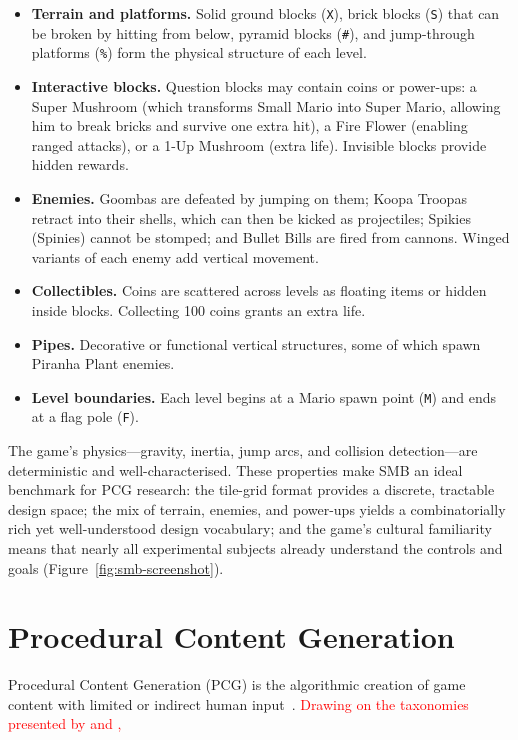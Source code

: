 \documentclass[shortabstract, mgr, english]{iithesis}
\newcommand{\changed}[1]{\textcolor{red}{#1}}
\begin{document}
\begin{itemize}[nosep]
  \item \textbf{Terrain and platforms.} Solid ground blocks (\texttt{X}), brick blocks
        (\texttt{S}) that can be broken by hitting from below, pyramid blocks
        (\texttt{\#}), and jump-through platforms (\texttt{\%}) form the physical
        structure of each level.
  \item \textbf{Interactive blocks.} Question blocks may contain coins or power-ups:
        a Super Mushroom (which transforms Small Mario into Super Mario, allowing him
        to break bricks and survive one extra hit), a Fire Flower (enabling ranged
        attacks), or a 1-Up Mushroom (extra life). Invisible blocks provide hidden
        rewards.
  \item \textbf{Enemies.} Goombas are defeated by jumping on them; Koopa Troopas
        retract into their shells, which can then be kicked as projectiles; Spikies
        (Spinies) cannot be stomped; and Bullet Bills are fired from cannons. Winged
        variants of each enemy add vertical movement.
  \item \textbf{Collectibles.} Coins are scattered across levels as floating items or
        hidden inside blocks. Collecting 100 coins grants an extra life.
  \item \textbf{Pipes.} Decorative or functional vertical structures, some of which
        spawn Piranha Plant enemies.
  \item \textbf{Level boundaries.} Each level begins at a Mario spawn point
        (\texttt{M}) and ends at a flag pole (\texttt{F}).
\end{itemize}

The game's physics---gravity, inertia, jump arcs, and collision detection---are
deterministic and well-characterised. These properties make SMB an ideal benchmark
for PCG research: the tile-grid format provides a discrete, tractable design space;
the mix of terrain, enemies, and power-ups yields a combinatorially rich yet
well-understood design vocabulary; and the game's cultural familiarity means that
nearly all experimental subjects already understand the controls and goals
(Figure~\ref{fig:smb-screenshot}).
\endgroup

\section{Procedural Content Generation}
\label{sec:bg-pcg}

Procedural Content Generation (PCG) is the algorithmic creation of game content
with limited or indirect human input~\citep{togelius2011search}. \changed{Drawing on the
taxonomies presented by \citet{togelius2011search} and \citet{summerville2018pcgml},}
\end{document}
